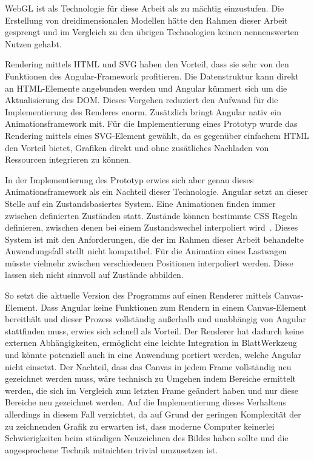WebGL ist als Technologie für diese Arbeit als zu mächtig einzustufen. Die Erstellung von dreidimensionalen Modellen hätte den Rahmen dieser Arbeit gesprengt und im Vergleich zu den übrigen Technologien keinen nennenswerten Nutzen gehabt.

Rendering mittels HTML und SVG haben den Vorteil, dass sie sehr von den Funktionen des Angular-Framework profitieren. Die Datenstruktur kann direkt an HTML-Elemente angebunden werden und Angular kümmert sich um die Aktualisierung des DOM. Dieses Vorgehen reduziert den Aufwand für die Implementierung des Renderes enorm. Zusätzlich bringt Angular nativ ein Animationsframework mit. Für die Implementierung eines Prototyp wurde das Rendering mittels eines SVG-Element gewählt, da es gegenüber einfachem HTML den Vorteil bietet, Grafiken direkt und ohne zusätliches Nachladen von Ressourcen integrieren zu können.

In der Implementierung des Prototyp erwies sich aber genau dieses Animationsframework als ein Nachteil dieser Technologie. Angular setzt an dieser Stelle auf ein Zustandsbasiertes System. Eine Animationen finden immer zwischen definierten Zuständen statt. Zustände können bestimmte CSS Regeln definieren, zwischen denen bei einem Zustandswechel interpoliert wird~\cite{angular-animations}. Dieses System ist mit den Anforderungen, die der im Rahmen dieser Arbeit behandelte Anwendungsfall stellt nicht kompatibel. Für die Animation eines Lastwagen müsste vielmehr zwischen verschiedenen Positionen interpoliert werden. Diese lassen sich nicht sinnvoll auf Zustände abbilden.

So setzt die aktuelle Version des Programms auf einen Renderer mittels Canvas-Element. Dass Angular keine Funktionen zum Rendern in einem Canvas-Element bereithält und dieser Prozess vollständig außerhalb und unabhängig von Angular stattfinden muss, erwies sich schnell als Vorteil. Der Renderer hat dadurch keine externen Abhängigkeiten, ermöglicht eine leichte Integration in BlattWerkzeug und könnte potenziell auch in eine Anwendung portiert werden, welche Angular nicht einsetzt. Der Nachteil, dass das Canvas in jedem Frame vollständig neu gezeichnet werden muss, wäre technisch zu Umgehen indem Bereiche ermittelt werden, die sich im Vergleich zum letzten Frame geändert haben und nur diese Bereiche neu gezeichnet werden. Auf die Implementierung dieses Verhaltens allerdings in diesem Fall verzichtet, da auf Grund der geringen Komplexität der zu zeichnenden Grafik zu erwarten ist, dass moderne Computer keinerlei Schwierigkeiten beim ständigen Neuzeichnen des Bildes haben sollte und die angesprochene Technik mitnichten trivial umzusetzen ist.

